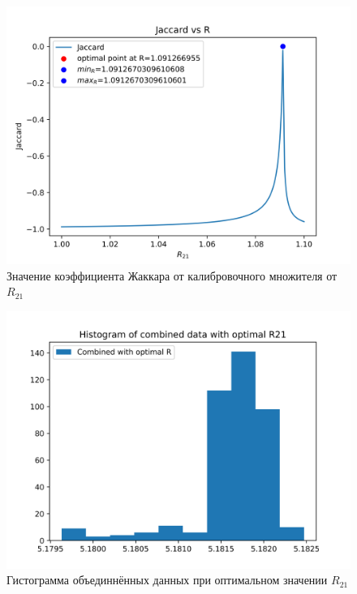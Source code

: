 \begin{figure}[H]
	\begin{center}
		\includegraphics[scale=0.5]{resources/jakkar.png}
	\end{center} \label{pic:jaccar}
	\caption{Значение коэффициента Жаккара от калибровочного множителя от $R_{21}$} 
\end{figure}

\begin{figure}[H]
	\begin{center}
		\includegraphics[scale=0.5]{resources/jakkar_combined_hist.png}
	\end{center} \label{pic:union}
	\caption{Гистограмма объединнённых данных при оптимальном значении $R_{21}$} 
\end{figure}

\newpage